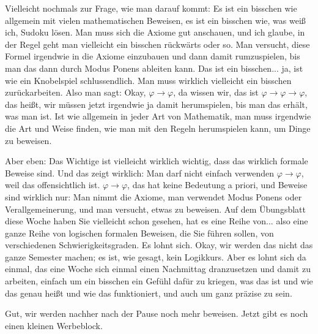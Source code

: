 \begin{spoken-clean}[00:39:19 - 00:41:28]
Vielleicht nochmals zur Frage, wie man darauf kommt: Es ist ein bisschen wie allgemein mit vielen mathematischen Beweisen, es ist ein bisschen wie, was weiß ich, Sudoku lösen. Man muss sich die Axiome gut anschauen, und ich glaube, in der Regel geht man vielleicht ein bisschen rückwärts oder so. Man versucht, diese Formel irgendwie in die Axiome einzubauen und dann damit rumzuspielen, bis man das dann durch Modus Ponens ableiten kann. Das ist ein bisschen... ja, ist wie ein Knobelspiel schlussendlich. Man muss wirklich vielleicht ein bisschen zurückarbeiten. Also man sagt: Okay, $\varphi \rightarrow \varphi$, da wissen wir, das ist $\varphi \rightarrow \varphi \rightarrow \varphi$, das heißt, wir müssen jetzt irgendwie ja damit herumspielen, bis man das erhält, was man ist. Ist wie allgemein in jeder Art von Mathematik, man muss irgendwie die Art und Weise finden, wie man mit den Regeln herumspielen kann, um Dinge zu beweisen.

Aber eben: Das Wichtige ist vielleicht wirklich wichtig, dass das wirklich formale Beweise sind. Und das zeigt wirklich: Man darf nicht einfach verwenden $\varphi \rightarrow \varphi$, weil das offensichtlich ist. $\varphi \rightarrow \varphi$, das hat keine Bedeutung a priori, und Beweise sind wirklich nur: Man nimmt die Axiome, man verwendet Modus Ponens oder Verallgemeinerung, und man versucht, etwas zu beweisen. Auf dem Übungsblatt diese Woche haben Sie vielleicht schon gesehen, hat es eine Reihe von... also eine ganze Reihe von logischen formalen Beweisen, die Sie führen sollen, von verschiedenen Schwierigkeitsgraden. Es lohnt sich. Okay, wir werden das nicht das ganze Semester machen; es ist, wie gesagt, kein Logikkurs. Aber es lohnt sich da einmal, das eine Woche sich einmal einen Nachmittag dranzusetzen und damit zu arbeiten, einfach um ein bisschen ein Gefühl dafür zu kriegen, was das ist und wie das genau heißt und wie das funktioniert, und auch um ganz präzise zu sein.

Gut, wir werden nachher nach der Pause noch mehr beweisen. Jetzt gibt es noch einen kleinen Werbeblock.
\end{spoken-clean}

\begin{lecture-break}
\end{lecture-break}

